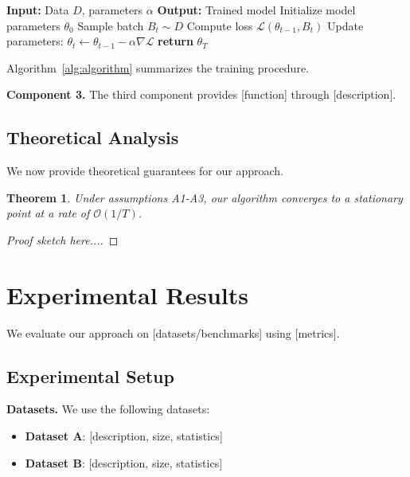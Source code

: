 \documentclass[conference]{IEEEtran}
\theoremstyle{plain}
\newtheorem{theorem}{Theorem}
\theoremstyle{definition}
\begin{document}
\begin{algorithm}[htbp]
\caption{Algorithm Name}
\label{alg:algorithm}
\begin{algorithmic}
\State \textbf{Input:} Data $D$, parameters $\alpha$
\State \textbf{Output:} Trained model
\State Initialize model parameters $\theta_0$
  \State Sample batch $B_t \sim D$
  \State Compute loss $\mathcal{L}(\theta_{t-1}, B_t)$
  \State Update parameters: $\theta_t \leftarrow \theta_{t-1} - \alpha \nabla \mathcal{L}$
\EndFor
\State \textbf{return} $\theta_T$
\end{algorithmic}
\end{algorithm}

Algorithm~\ref{alg:algorithm} summarizes the training procedure.

\textbf{Component 3.} The third component provides [function] through
[description].

\subsection{Theoretical Analysis}

We now provide theoretical guarantees for our approach.

\begin{theorem}
Under assumptions A1-A3, our algorithm converges to a stationary point
at a rate of $\mathcal{O}(1/T)$.
\end{theorem}

\begin{proof}
[Proof sketch here...]
\end{proof}

\section{Experimental Results}
\label{sec:experiments}

We evaluate our approach on [datasets/benchmarks] using [metrics].

\subsection{Experimental Setup}

\textbf{Datasets.} We use the following datasets:
\begin{itemize}
  \item \textbf{Dataset A}: [description, size, statistics]
  \item \textbf{Dataset B}: [description, size, statistics]
\end{itemize}
\end{document}
